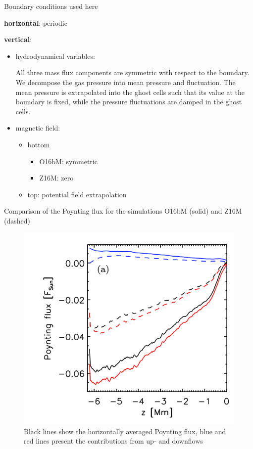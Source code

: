 \documentclass{beamer}
\begin{document}
\begin{frame}{Boundary conditions used here}

{\bf horizontal}: periodic

{\bf vertical}: 

\begin{itemize}

\item hydrodynamical variables:

All three mass flux components are symmetric with
respect to the boundary. We decompose the gas pressure
into mean pressure and fluctuation.  The
mean pressure is extrapolated into the ghost cells such
that its value at the boundary is fixed, while the pressure
fluctuations are damped in the ghost cells.

\item magnetic field:

\begin{itemize}
\item bottom
\begin{itemize}

\item O16bM: symmetric
\item Z16M: zero
 

\end{itemize}
\item top:  potential field extrapolation
\end{itemize}
\end{itemize}

\end{frame}

\begin{frame}{Comparison of the Poynting flux for the simulations O16bM (solid) and Z16M (dashed)}

\begin{figure}[H]
 \centering
 \includegraphics[scale=0.3]{poynting1.png}
	\caption{Black lines show the horizontally
averaged Poynting flux, blue and red lines present the contributions from up- and downflows}
\end{figure}

\end{frame}
\end{document}
